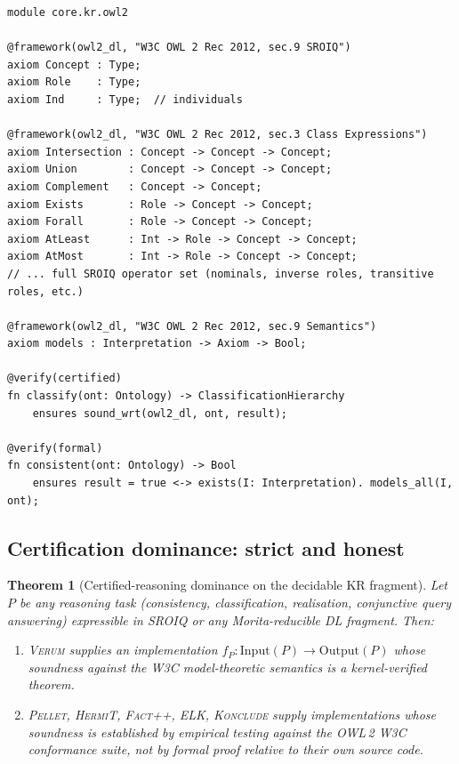 \documentclass[11pt, a4paper]{article}
\newtheorem{theorem}{Theorem}[section]
\theoremstyle{definition}
\theoremstyle{remark}
\newcommand{\Verum}{\textsc{Verum}}
\newcommand{\Pellet}{\textsc{Pellet}}
\newcommand{\HermiT}{\textsc{HermiT}}
\newcommand{\FactPP}{\textsc{Fact++}}
\newcommand{\ELK}{\textsc{ELK}}
\newcommand{\Konclude}{\textsc{Konclude}}
\begin{document}
\begin{lstlisting}[caption={Illustrative skeleton of \texttt{core.kr.owl2}.}]
module core.kr.owl2

@framework(owl2_dl, "W3C OWL 2 Rec 2012, sec.9 SROIQ")
axiom Concept : Type;
axiom Role    : Type;
axiom Ind     : Type;  // individuals

@framework(owl2_dl, "W3C OWL 2 Rec 2012, sec.3 Class Expressions")
axiom Intersection : Concept -> Concept -> Concept;
axiom Union        : Concept -> Concept -> Concept;
axiom Complement   : Concept -> Concept;
axiom Exists       : Role -> Concept -> Concept;
axiom Forall       : Role -> Concept -> Concept;
axiom AtLeast      : Int -> Role -> Concept -> Concept;
axiom AtMost       : Int -> Role -> Concept -> Concept;
// ... full SROIQ operator set (nominals, inverse roles, transitive roles, etc.)

@framework(owl2_dl, "W3C OWL 2 Rec 2012, sec.9 Semantics")
axiom models : Interpretation -> Axiom -> Bool;

@verify(certified)
fn classify(ont: Ontology) -> ClassificationHierarchy
    ensures sound_wrt(owl2_dl, ont, result);

@verify(formal)
fn consistent(ont: Ontology) -> Bool
    ensures result = true <-> exists(I: Interpretation). models_all(I, ont);
\end{lstlisting}

\subsection{Certification dominance: strict and honest}
\label{subsec:kr-certification-dominance}

\begin{theorem}[Certified-reasoning dominance on the decidable KR fragment]
\label{thm:kr-cert-dominance}
Let $P$ be any reasoning task (consistency, classification, realisation, conjunctive query answering) expressible in \textsf{SROIQ} or any Morita-reducible DL fragment. Then:
\begin{enumerate}[label=(\alph*), nosep]
\item \Verum{} supplies an implementation $f_P : \mathrm{Input}(P) \to \mathrm{Output}(P)$ whose soundness against the W3C model-theoretic semantics is a kernel-verified theorem.
\item \Pellet, \HermiT, \FactPP, \ELK, \Konclude{} supply implementations whose soundness is established by empirical testing against the OWL\,2 W3C conformance suite, not by formal proof relative to their own source code.
\end{enumerate}
\end{theorem}
\end{document}

